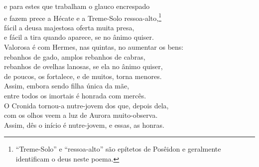 e para estes que trabalham o glauco encrespado \\
e fazem prece a Hécate e a Treme-Solo ressoa-alto,\footnote{``Treme-Solo'' e ``ressoa-alto'' são epítetos de Posêidon e geralmente identificam o deus neste poema.}\\
fácil a deusa majestosa oferta muita presa,\\
e fácil a tira quando aparece, se no ânimo quiser.\\
Valorosa é com Hermes, nas quintas, no aumentar os bens:\\
rebanhos de gado, amplos rebanhos de cabras, \\
rebanhos de ovelhas lanosas, se ela no ânimo quiser,\\
de poucos, os fortalece, e de muitos, torna menores.\\
Assim, embora sendo filha única da mãe,\\
entre todos os imortais é honrada com mercês.\\
O Cronida tornou-a nutre-jovem dos que, depois dela, \\
com os olhos veem a luz de Aurora muito-observa.\\
Assim, dês o início é nutre-jovem, e essas, as honras.


